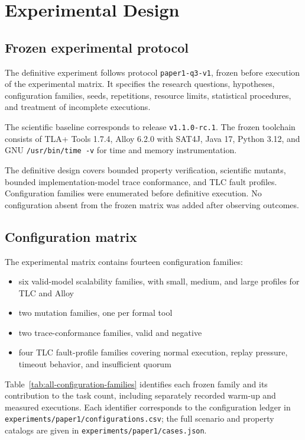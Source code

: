 \section{Experimental Design}
\label{sec:experimental-design}

\subsection{Frozen experimental protocol}
\label{subsec:frozen-protocol}

The definitive experiment follows protocol \texttt{paper1-q3-v1}, frozen before
execution of the experimental matrix. It specifies the research questions,
hypotheses, configuration families, seeds, repetitions, resource limits,
statistical procedures, and treatment of incomplete executions.

The scientific baseline corresponds to release \texttt{v1.1.0-rc.1}. The frozen
toolchain consists of TLA+ Tools 1.7.4, Alloy 6.2.0 with SAT4J, Java 17,
Python 3.12, and GNU \texttt{/usr/bin/time -v} for time and memory
instrumentation.

The definitive design covers bounded property verification, scientific mutants,
bounded implementation-model trace conformance, and TLC fault profiles.
Configuration families were enumerated before definitive execution. No
configuration absent from the frozen matrix was added after observing outcomes.

\subsection{Configuration matrix}
\label{subsec:configuration-matrix}

The experimental matrix contains fourteen configuration families:

\begin{itemize}
\item six valid-model scalability families, with small, medium, and large
profiles for TLC and Alloy
\item two mutation families, one per formal tool
\item two trace-conformance families, valid and negative
\item four TLC fault-profile families covering normal execution, replay
pressure, timeout behavior, and insufficient quorum
\end{itemize}

Table~\ref{tab:all-configuration-families} identifies each frozen family and its
contribution to the task count, including separately recorded warm-up and
measured executions. Each identifier corresponds to the configuration ledger
in \texttt{experiments/paper1/configurations.csv}; the full scenario and
property catalogs are given in \texttt{experiments/paper1/cases.json}.


